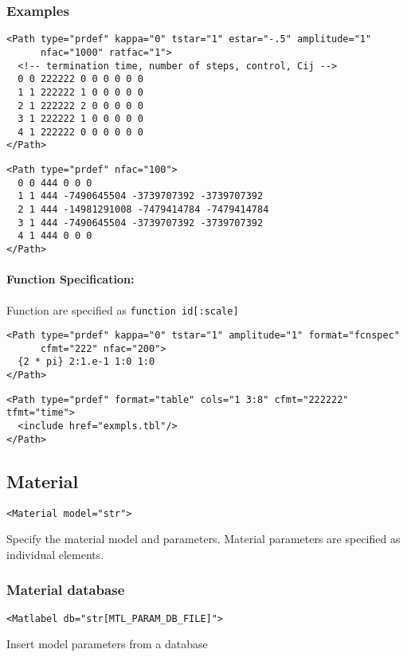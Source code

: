 \documentclass[11pt]{report}
\begin{document}
\subsubsection{Examples}
\begin{verbatim}
<Path type="prdef" kappa="0" tstar="1" estar="-.5" amplitude="1"
      nfac="1000" ratfac="1">
  <!-- termination time, number of steps, control, Cij -->
  0 0 222222 0 0 0 0 0 0
  1 1 222222 1 0 0 0 0 0
  2 1 222222 2 0 0 0 0 0
  3 1 222222 1 0 0 0 0 0
  4 1 222222 0 0 0 0 0 0
</Path>
\end{verbatim}

\begin{verbatim}
<Path type="prdef" nfac="100">
  0 0 444 0 0 0
  1 1 444 -7490645504 -3739707392 -3739707392
  2 1 444 -14981291008 -7479414784 -7479414784
  3 1 444 -7490645504 -3739707392 -3739707392
  4 1 444 0 0 0
</Path>
\end{verbatim}

\paragraph{Function Specification:}
Function are specified as \texttt{function id[:scale]}
\begin{verbatim}
<Path type="prdef" kappa="0" tstar="1" amplitude="1" format="fcnspec"
      cfmt="222" nfac="200">
  {2 * pi} 2:1.e-1 1:0 1:0
</Path>
\end{verbatim}

\begin{verbatim}
<Path type="prdef" format="table" cols="1 3:8" cfmt="222222" tfmt="time">
  <include href="exmpls.tbl"/>
</Path>
\end{verbatim}

\subsection{Material}
\begin{verbatim}
<Material model="str">
\end{verbatim}
%
Specify the material model and parameters. Material parameters are specified
as individual elements.

\subsubsection{Material database}
\begin{verbatim}
<Matlabel db="str[MTL_PARAM_DB_FILE]">
\end{verbatim}
%
Insert model parameters from a database
\end{document}
